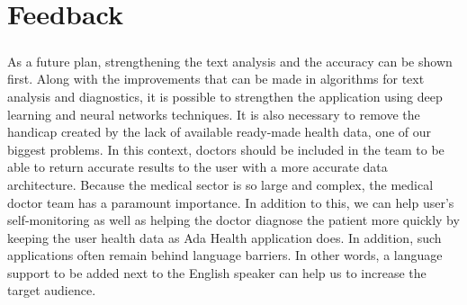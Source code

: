 \chapter{Feedback}

\paragraph{}
As	a	future	plan,	strengthening	the	text	analysis	and	the	accuracy	can	be	shown	first.	Along	with	the	improvements	that	can	be	made	in	algorithms	for	text	analysis	and	diagnostics,	it	is	possible	to	strengthen	the	application	using	deep	learning	and	neural	networks	techniques.	It	is	also	necessary	to	remove	the	handicap	created	by	the	lack	of	available	ready-made	health	data,	one	of	our	biggest	problems.	In	this	context,	doctors	should	be	included	in	the	team	to	be	able	to	return	accurate	results	to	the	user	with	a	more	accurate	data	architecture.	Because	the	medical	sector	is	so	large	and	complex,	the	medical	doctor	team	has	a	paramount	importance.	In	addition	to	this,	we	can	help	user's	self-monitoring	as	well	as	helping	the	doctor	diagnose	the	patient	more	quickly	by	keeping	the	user	health	data	as	Ada	Health	application	does.		In	addition,	such	applications	often	remain	behind	language	barriers.	In	other	words,	a	language	support	to	be	added	next	to	the	English	speaker	can	help	us	to	increase	the	target	audience.	
